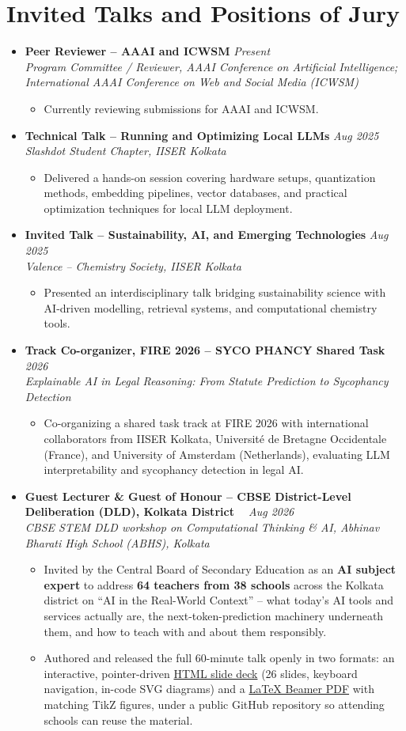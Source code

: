 \documentclass[a4paper,10pt]{article}
\newcommand{\resumeProject}[4]{
    \item\small{
        \textbf{#1} \hfill \textit{#2}\\
        \textit{#3}\\
        \begin{itemize}[leftmargin=1.5em,label=\textbullet,nosep,itemsep=0.5pt]
            #4
        \end{itemize}
    }\vspace{2pt}
}
\newcommand{\compactSection}[2]{
    \section{#1}
    \vspace{-0.1cm}
    #2
    \vspace{-0.2cm}
}
\begin{document}
\compactSection{Invited Talks and Positions of Jury}{
\begin{itemize}[leftmargin=*,label={},itemsep=4pt]

    \resumeProject{Peer Reviewer -- AAAI and ICWSM}{Present}
    {Program Committee / Reviewer, AAAI Conference on Artificial Intelligence; International AAAI Conference on Web and Social Media (ICWSM)}
    {\item Currently reviewing submissions for AAAI and ICWSM.}

    \resumeProject{Technical Talk – Running and Optimizing Local LLMs}{Aug 2025}
    {Slashdot Student Chapter, IISER Kolkata}
    {
        \item Delivered a hands-on session covering hardware setups, quantization methods, embedding pipelines, vector databases, and practical optimization techniques for local LLM deployment.
    }

    \resumeProject{Invited Talk – Sustainability, AI, and Emerging Technologies}{Aug 2025}
    {Valence – Chemistry Society, IISER Kolkata}
    {
        \item Presented an interdisciplinary talk bridging sustainability science with AI-driven modelling, retrieval systems, and computational chemistry tools.

    }
    \resumeProject{Track Co-organizer, FIRE 2026 -- SYCO PHANCY Shared Task \href{https://sycolex.com/}{\faGlobe}}{2026}
    {Explainable AI in Legal Reasoning: From Statute Prediction to Sycophancy Detection}
    {\item Co-organizing a shared task track at FIRE 2026 with international collaborators from IISER Kolkata, Université de Bretagne Occidentale (France), and University of Amsterdam (Netherlands), evaluating LLM interpretability and sycophancy detection in legal AI.}

    \resumeProject{Guest Lecturer \& Guest of Honour -- CBSE District-Level Deliberation (DLD), Kolkata District \href{https://shuvam-banerji-seal.github.io/ai-in-real-world-context/}{\faGlobe}\ \href{https://github.com/Shuvam-Banerji-Seal/ai-in-real-world-context}{\faGithub}}{Aug 2026}
    {CBSE STEM DLD workshop on Computational Thinking \& AI, Abhinav Bharati High School (ABHS), Kolkata}
    {\item Invited by the Central Board of Secondary Education as an \textbf{AI subject expert} to address \textbf{64 teachers from 38 schools} across the Kolkata district on ``AI in the Real-World Context'' -- what today's AI tools and services actually are, the next-token-prediction machinery underneath them, and how to teach with and about them responsibly.
    \item Authored and released the full 60-minute talk openly in two formats: an interactive, pointer-driven \href{https://shuvam-banerji-seal.github.io/ai-in-real-world-context/}{HTML slide deck} (26 slides, keyboard navigation, in-code SVG diagrams) and a \href{https://shuvam-banerji-seal.github.io/ai-in-real-world-context/main.pdf}{LaTeX Beamer PDF} with matching TikZ figures, under a public GitHub repository so attending schools can reuse the material.}


\end{itemize}}
\end{document}
